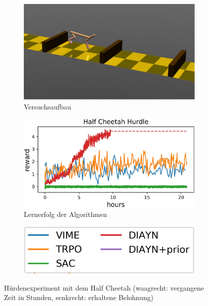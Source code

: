 \begin{figure}[h]
\begin{subfigure}{0.38\textwidth}
\includegraphics[width=\textwidth, keepaspectratio=true]{images/cheetah_hurdle_image.JPG}
\caption{Versuchsaufbau} \label{img:cheetah_hurdle_img}
\end{subfigure}
\begin{subfigure}{0.4\textwidth}
\includegraphics[width=\textwidth, keepaspectratio=true]{images/cheetah_hurdle.JPG}
\caption{Lernerfolg der Algorithmen} \label{img:cheetah_hurdle_graph}
\end{subfigure}
\begin{subfigure}{0.2\textwidth}
\includegraphics[width=\textwidth, keepaspectratio=true]{images/cheetah_hurdle_exp.JPG}
\end{subfigure}
\caption{Hürdenexperiment mit dem Half Cheetah (waagrecht: vergangene Zeit in Stunden, senkrecht: erhaltene Belohnung)} \label{img:cheetah_hurdle}
\end{figure}


